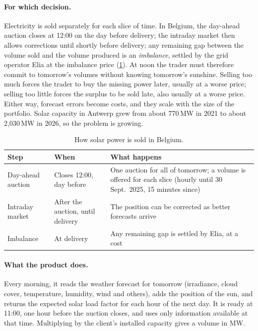 \documentclass[11pt,a4paper]{article}
\begin{document}
\paragraph{For which decision.}
Electricity is sold separately for each slice of time. In Belgium, the day-ahead auction closes at
12:00 on the day before delivery; the intraday market then allows corrections until shortly before
delivery; any remaining gap between the volume sold and the volume produced is an
\emph{imbalance}, settled by the grid operator Elia at the imbalance price
(\cref{tab:market}). At noon the trader must therefore commit to tomorrow's volumes without knowing
tomorrow's sunshine. Selling too much forces the trader to buy the missing power later, usually at
a worse price; selling too little forces the surplus to be sold late, also usually at a worse
price. Either way, forecast errors become costs, and they scale with the size of the portfolio.
Solar capacity in Antwerp grew from about 770\,MW in 2021 to about 2,030\,MW in 2026, so the
problem is growing.

\begin{table}[ht]
\centering\small
\caption{How solar power is sold in Belgium.}
\label{tab:market}
\begin{tabularx}{\linewidth}{@{}l l X@{}}
\toprule
Step & When & What happens \\
\midrule
Day-ahead auction & Closes 12:00, day before & One auction for all of tomorrow; a volume is offered for each slice (hourly until 30 Sept.\ 2025, 15 minutes since) \\
Intraday market & After the auction, until delivery & The position can be corrected as better forecasts arrive \\
Imbalance & At delivery & Any remaining gap is settled by Elia, at a cost \\
\bottomrule
\end{tabularx}
\end{table}

\paragraph{What the product does.}
Every morning, it reads the weather forecast for tomorrow (irradiance, cloud cover, temperature,
humidity, wind and others), adds the position of the sun, and returns the expected solar load
factor for each hour of the next day. It is ready at 11:00, one hour before the auction closes,
and uses only information available at that time. Multiplying by the client's installed capacity
gives a volume in MW.
\end{document}
